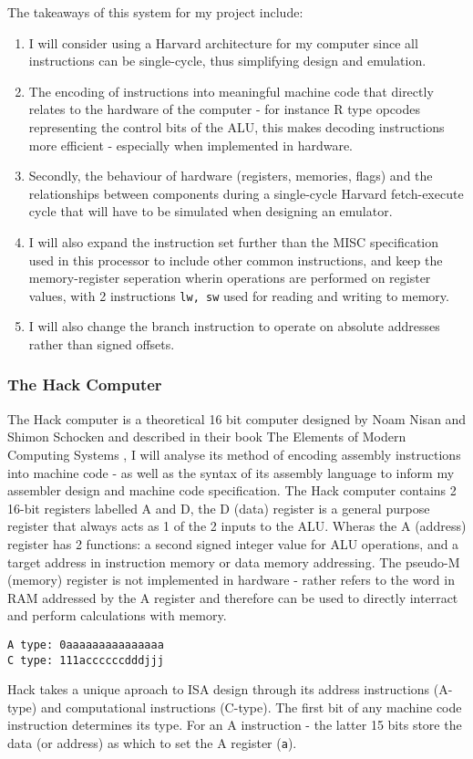 \bigskip

The takeaways of this system for my project include:
\begin{enumerate}
    \item I will consider using a Harvard architecture for my computer since all instructions can be single-cycle, thus simplifying design and emulation.
    \item The encoding of instructions into meaningful machine code that directly relates to the hardware of the computer - for instance R type opcodes representing the control bits of the ALU, this makes decoding instructions more efficient - especially when implemented in hardware.
    \item Secondly, the behaviour of hardware (registers, memories, flags) and the relationships between components during a single-cycle Harvard fetch-execute cycle that will have to be simulated when designing an emulator.
    \item I will also expand the instruction set further than the MISC specification used in this processor to include other common instructions, and keep the memory-register seperation wherin operations are performed on register values, with 2 instructions \texttt{lw, sw} used for reading and writing to memory.
    \item I will also change the branch instruction to operate on absolute addresses rather than signed offsets.
\end{enumerate}

\subsubsection{The Hack Computer}
The Hack computer is a theoretical 16 bit computer designed by Noam Nisan and Shimon Schocken and described in their book The Elements of Modern Computing Systems \textcite{EOCS}, I will analyse its method of encoding assembly instructions into machine code - as well as the syntax of its assembly language to inform my assembler design and machine code specification. The Hack computer contains 2 16-bit registers labelled A and D, the D (data) register is a general purpose register that always acts as 1 of the 2 inputs to the ALU. Wheras the A (address) register has 2 functions: a second signed integer value for ALU operations, and a target address in instruction memory or data memory addressing. The pseudo-M (memory) register is not implemented in hardware - rather refers to the word in RAM addressed by the A register and therefore can be used to directly interract and perform calculations with memory.
\begin{lstlisting}
A type: 0aaaaaaaaaaaaaaa
C type: 111accccccdddjjj
\end{lstlisting} 
Hack takes a unique aproach to ISA design through its address instructions (A-type) and computational instructions (C-type). The first bit of any machine code instruction determines its type. For an A instruction - the latter 15 bits store the data (or address) as which to set the A register (\texttt{a}). 

